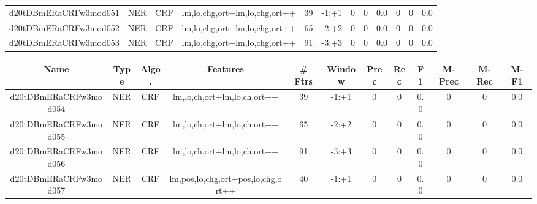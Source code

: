 \documentclass[a4paper]{article}
\begin{document}
\begin{landscape}
\begin{center}
\begin{tabular}{ |c|c|c|c|c|c|c|c|c|c|c|c|}
 	\small{ d20tDBmERaCRFw3mod051 } & \small{ NER} & \small{  CRF }  & lm,lo,chg,ort+lm,lo,chg,ort++  &  39 &  \small{  -1:+1 }  &  0 & 0 & 0.0  &  0 & 0 & 0.0 \\
 	

 
 	
 	\small{ d20tDBmERaCRFw3mod052 } & \small{ NER} & \small{  CRF }  & lm,lo,chg,ort+lm,lo,chg,ort++  &  65 &  \small{  -2:+2 }  &  0 & 0 & 0.0  &  0 & 0 & 0.0 \\
 	

 
 	
 	\small{ d20tDBmERaCRFw3mod053 } & \small{ NER} & \small{  CRF }  & lm,lo,chg,ort+lm,lo,chg,ort++  &  91 &  \small{  -3:+3 }  &  0 & 0 & 0.0  &  0 & 0 & 0.0 \\
 	
 \hline
\end{tabular}
\end{center}




\begin{center}
\begin{tabular}{ |c|c|c|c|c|c|c|c|c|c|c|c|} 
 \hline
 	Name & Type & Algo. & Features & \# Ftrs & Window & Prec & Rec & F1 & M-Prec & M-Rec & M-F1\\
 \hline

 	

 
 	
 	\small{ d20tDBmERaCRFw3mod054 } & \small{ NER} & \small{  CRF }  & lm,lo,ch,ort+lm,lo,ch,ort++  &  39 &  \small{  -1:+1 }  &  0 & 0 & 0.0  &  0 & 0 & 0.0 \\
 	

 
 	
 	\small{ d20tDBmERaCRFw3mod055 } & \small{ NER} & \small{  CRF }  & lm,lo,ch,ort+lm,lo,ch,ort++  &  65 &  \small{  -2:+2 }  &  0 & 0 & 0.0  &  0 & 0 & 0.0 \\
 	

 
 	
 	\small{ d20tDBmERaCRFw3mod056 } & \small{ NER} & \small{  CRF }  & lm,lo,ch,ort+lm,lo,ch,ort++  &  91 &  \small{  -3:+3 }  &  0 & 0 & 0.0  &  0 & 0 & 0.0 \\
 	

 
 	
 	\small{ d20tDBmERaCRFw3mod057 } & \small{ NER} & \small{  CRF }  & lm,pos,lo,chg,ort+pos,lo,chg,ort++  &  40 &  \small{  -1:+1 }  &  0 & 0 & 0.0  &  0 & 0 & 0.0 \\
 	

 
 	

\end{tabular}
\end{center}
\end{landscape}
\end{document}
